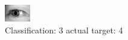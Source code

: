\begin{figure}[h!]
\begin{center}
\includegraphics[width=0.60\columnwidth]{figures/ID3257_class_3_target_4.png}
\end{center}
\caption{ Classification: 3 actual target: 4}
\label{fig:ID3257_class_3_target_4}
\end{figure}
